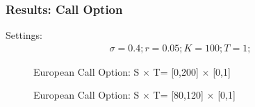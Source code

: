 \documentclass[blue]{beamer}
\begin{document}
\begin{frame}
\frametitle{Results: Call Option}
Settings:
\begin{align*}
\sigma = 0.4;
r = 0.05;
K = 100;
T = 1;
\end{align*}
\begin{figure}[H]
	\centering
	\begin{minipage}[t]{.45\linewidth}
		\caption{European Call Option: S $\times $ T= [0,200] $\times $ [0,1]}
	\end{minipage}
	\begin{minipage}[t]{.45\linewidth}
		\caption{European Call Option: S $\times $ T= [80,120] $\times $ [0,1]}
	\end{minipage}
\end{figure}
\end{frame}
\end{document}
